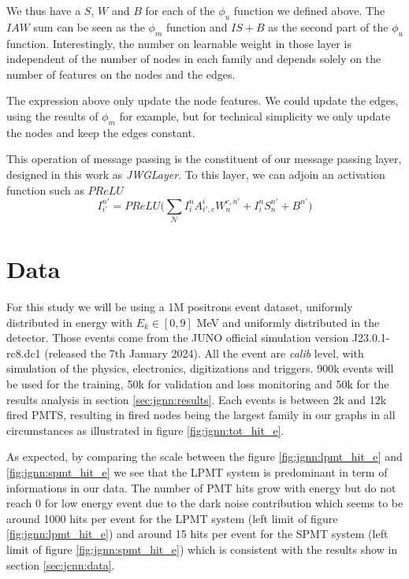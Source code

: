 \documentclass[../main.tex]{subfiles}
\begin{document}
We thus have a $S$, $W$ and $B$ for each of the $\phi_u$ function we defined above. The $IAW$ sum can be seen as the $\phi_m$ function and $IS+B$ as the second part of the $\phi_u$ function. Interestingly, the number on learnable weight in those layer is independent of the number of nodes in each family and depends solely on the number of features on the nodes and the edges.

The expression above only update the node features. We could update the edges, using the results of $\phi_m$ for example, but for technical simplicity we only update the nodes and keep the edges constant.

This operation of message passing is the constituent of our message passing layer, designed in this work as \textit{JWGLayer}. To this layer, we can adjoin an activation function such as $PReLU$
\begin{equation}
  I^{n'}_{i'} = PReLU\bigg(\sum_\mathcal{N} I^n_i A_{i',e}^{i} W_n^{e,n'} +  I^n_i S^{n'}_{n} + B^{n'} \bigg)
\end{equation}


\section{Data}

For this study we will be using a 1M positrons event dataset, uniformly distributed in energy with $E_k \in [0, 9]$ MeV and uniformly distributed in the detector. Those events come from the JUNO official simulation version J23.0.1-rc8.dc1 (released the 7th January 2024). All the event are \textit{calib} level, with simulation of the physics, electronics, digitizations and triggers. 900k events will be used for the training, 50k for validation and loss monitoring and 50k for the results analysis in section \ref{sec:jgnn:results}. Each events is between 2k and 12k fired PMTS, resulting in fired nodes being the largest family in our graphs in all circumstances as illustrated in figure \ref{fig:jgnn:tot_hit_e}.

As expected, by comparing the scale between the figure \ref{fig:jgnn:lpmt_hit_e} and \ref{fig:jgnn:spmt_hit_e} we see that the LPMT system is predominant in term of informations in our data. The number of PMT hits grow with energy but do not reach 0 for low energy event due to the dark noise contribution which seems to be around 1000 hits per event for the LPMT system (left limit of figure \ref{fig:jgnn:lpmt_hit_e}) and around 15 hits per event for the SPMT system (left limit of figure \ref{fig:jgnn:spmt_hit_e}) which is consistent with the results show in section \ref{sec:jcnn:data}.
\end{document}
